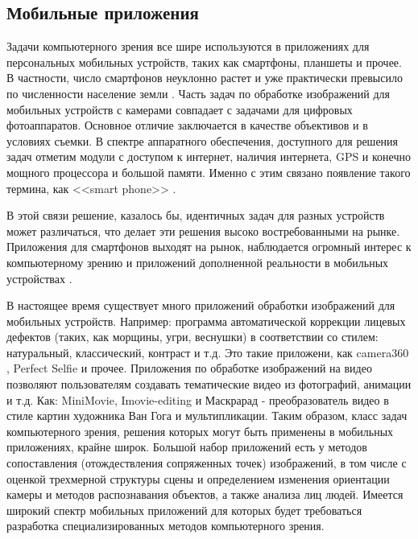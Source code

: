 \subsection{Мобильные приложения}

Задачи компьютерного зрения все шире используются в приложениях для персональных мобильных устройств, таких как смартфоны, планшеты и прочее. В частности, число смартфонов неуклонно растет и уже практически превысило по численности население земли \cite{Battiato2012}. Часть задач по обработке изображений для мобильных устройств с камерами совпадает с задачами для цифровых фотоаппаратов. Основное отличие заключается в качестве объективов и в условиях съемки. В спектре аппаратного обеспечения, доступного для решения задач отметим модули с доступом к интернет, наличия интернета, GPS и конечно мощного процессора и большой памяти. Именно с этим связано появление такого термина, как <<smart phone>> \cite{Hannuksela2007}. 

В этой связи решение, казалось бы, идентичных задач для разных устройств может различаться, что делает эти решения высоко востребованными на рынке. Приложения для смартфонов выходят на рынок, наблюдается огромный интерес к компьютерному зрению и приложений дополненной реальности в мобильных устройствах \cite{Shubina2010}. 


В настоящее время существует много приложений обработки изображений для мобильных устройств. Например: программа автоматической коррекции лицевых дефектов (таких, как морщины, угри, веснушки) в соответствии со стилем: натуральный, классический, контраст и т.д. Это такие приложени, как camera360 , Perfect Selfie и прочее. Приложения по обработке изображений на видео позволяют пользователям создавать тематические видео из фотографий, анимации и т.д.  Как: MiniMovie, Imovie-editing и Маскрарад - преобразователь видео в стиле картин художника Ван Гога и мультипликации. Таким образом, класс задач компьютерного зрения, решения которых могут быть применены в мобильных приложениях, крайне широк. Большой набор приложений есть у методов сопоставления (отождествления сопряженных точек) изображений, в том числе с оценкой трехмерной структуры сцены и определением изменения ориентации камеры и методов распознавания объектов, а также анализа лиц людей. Имеется широкий спектр мобильных приложений для которых будет требоваться разработка специализированных методов компьютерного зрения.